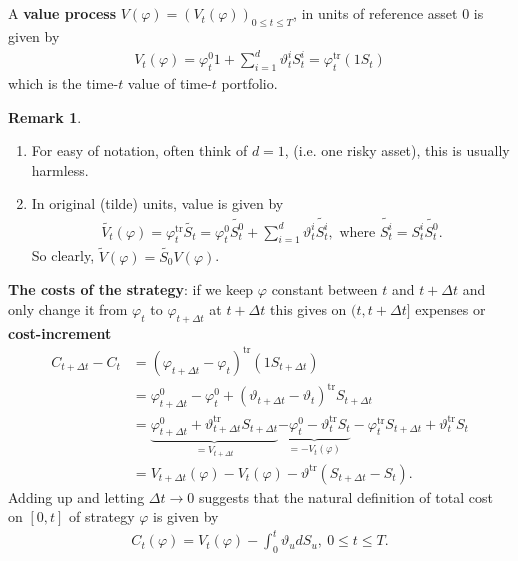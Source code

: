 \documentclass[12pt,a4paper, twoside]{article}
\theoremstyle{definition}
\newtheorem{rem}{Remark}[section]
\begin{document}
\\\\
A \textbf{value process} $V(\varphi)= ( V_t( \varphi))_{0 \leq t \leq T}$, in units of reference asset $0$ is given by 
\begin{align*}
V_t( \varphi) = \varphi_t^0 1 + \sum_{i=1}^d \vartheta_t^i S_t^i = \varphi_t^{\text{tr}} (1S_t)
\end{align*}
which is the time-$t$ value of time-$t$ portfolio. 
\begin{rem} \
\begin{enumerate}
\item For easy of notation, often think of $d=1$, (i.e. one risky asset), this is usually harmless. 
\item In original (tilde) units, value is given by 
\begin{align*}
\widetilde{V_t}( \varphi)= \varphi_t^{\text{tr}} \widetilde{S_t} = \varphi_t^0 \widetilde{S_t^0} + \sum_{i=1}^d \vartheta_t^i \widetilde{S_t^i}, \text{ where }  \widetilde{S_t^i}= S_t^i \widetilde{S_t^0}.
\end{align*}
So clearly,  $\widetilde{V}(\varphi)= \widetilde{S_0}V( \varphi)$. 
\end{enumerate}
\end{rem}
\noindent \textbf{The costs of the strategy}: if we keep $\varphi$ constant between $t$ and $t + \Delta t$ and only change it from $\varphi_t$ to $\varphi_{t + \Delta t}$ at $t + \Delta t$ this gives on $(t,t+ \Delta t]$ expenses or \textbf{cost-increment} 
\begin{align*}
C_{t + \Delta t} - C_t &= ( \varphi_{t + \Delta t } - \varphi_t)^{\text{tr}} (1 S_{t + \Delta t}) \\
&= \varphi_{t + \Delta t}^0 - \varphi_t^0 + ( \vartheta_{t + \Delta t} - \vartheta_t)^{\text{tr}} S_{t + \Delta t }  \\
&= \underbrace{\varphi_{t + \Delta t}^0 + \vartheta_{t + \Delta t}^{\text{tr}} S_{t + \Delta t}}_{= V_{t + \Delta t}} \underbrace{- \varphi_t^0 - \vartheta_t^{\text{tr}} S_t}_{= - V_t( \varphi)}- \varphi_t^{\text{tr}} S_{t+ \Delta t} + \vartheta_t^{\text{tr}} S_t  \\ 
&= V_{t + \Delta t} ( \varphi) - V_t( \varphi) - \vartheta^{\text{tr}}( S_{t + \Delta t} - S_t). 
\end{align*}
Adding up and letting $\Delta t \to 0$ suggests that the natural definition of total cost on $[0,t]$ of strategy $\varphi$ is given by 
\begin{align*}
C_t( \varphi) = V_t( \varphi)- \int_0^t \vartheta_u d S_u, \ 0 \leq t \leq T. 
\end{align*}
\end{document}
